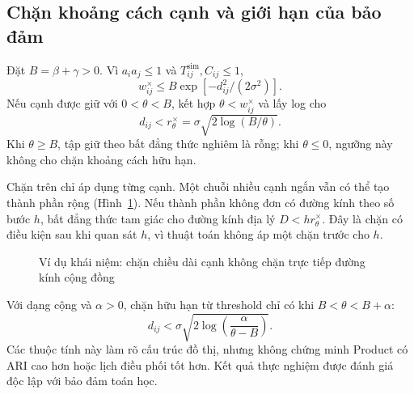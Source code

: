 \subsection{Chặn khoảng cách cạnh và giới hạn của bảo đảm}
Đặt $B=\beta+\gamma>0$. Vì $a_ia_j\leq1$ và $T_{ij}^{\mathrm{sim}},C_{ij}\leq1$,
\begin{equation}
 w_{ij}^{\times}\leq B\exp[-d_{ij}^2/(2\sigma^2)].
 \label{eq:edge-upper}
\end{equation}
Nếu cạnh được giữ với $0<\theta<B$, kết hợp $\theta<w_{ij}^{\times}$ và lấy log cho
\begin{equation}
 d_{ij}<r_{\theta}^{\times}=\sigma\sqrt{2\log(B/\theta)}.
 \label{eq:edge-radius}
\end{equation}
Khi $\theta\geq B$, tập giữ theo bất đẳng thức nghiêm là rỗng; khi $\theta\leq0$, ngưỡng này không cho chặn khoảng cách hữu hạn.

Chặn trên chỉ áp dụng từng cạnh. Một chuỗi nhiều cạnh ngắn vẫn có thể tạo thành phần rộng (Hình~\ref{fig:edge-chain}). Nếu thành phần không đơn có đường kính theo số bước $h$, bất đẳng thức tam giác cho đường kính địa lý $D<hr_{\theta}^{\times}$. Đây là chặn có điều kiện sau khi quan sát $h$, vì thuật toán không áp một chặn trước cho $h$.

\begin{figure}[H]\centering
{}
\caption{Ví dụ khái niệm: chặn chiều dài cạnh không chặn trực tiếp đường kính cộng đồng}
\label{fig:edge-chain}
\end{figure}

Với dạng cộng và $\alpha>0$, chặn hữu hạn từ threshold chỉ có khi $B<\theta<B+\alpha$:
\begin{equation}
 d_{ij}<\sigma\sqrt{2\log\!\left(\frac{\alpha}{\theta-B}\right)}.
 \label{eq:additive-bound}
\end{equation}
Các thuộc tính này làm rõ cấu trúc đồ thị, nhưng không chứng minh Product có ARI cao hơn hoặc lịch điều phối tốt hơn. Kết quả thực nghiệm được đánh giá độc lập với bảo đảm toán học.


